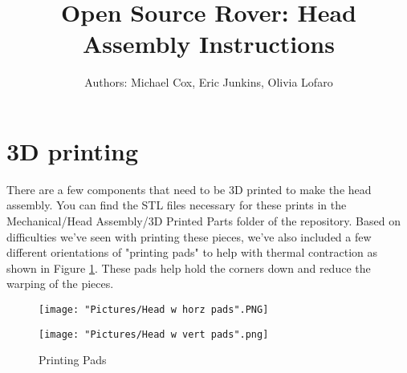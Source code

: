 \documentclass[12pt]{article}
\begin{document}
\newcommand\partimg{\includegraphics[width=2cm,height=1.25cm,keepaspectratio]}


\title{Open Source Rover: Head Assembly Instructions}
\author{Authors: Michael Cox, Eric Junkins, Olivia Lofaro}

\makeatletter
\def\@maketitle{
\begin{center}
	\makebox[\textwidth][c]{ \texttt{[image: "Pictures/Head final".png]}}
	{\Huge \bfseries \sffamily \@title }\\[3ex]
	{\Large \sffamily \@author}\\[3ex]
	\texttt{[image: "Pictures/JPL logo".png]}
\end{center}}
\makeatother

\maketitle



\newpage


\tableofcontents

\newpage

\section{3D printing}
There are a few components that need to be 3D printed to make the head assembly. You can find the STL files necessary for these prints in the Mechanical/Head Assembly/3D Printed Parts folder of the repository.  Based on difficulties we've seen with printing these pieces, we've also included a few different orientations of "printing pads" to help with thermal contraction as shown in Figure \ref{pads}. These pads help hold the corners down and reduce the warping of the pieces.

\begin{figure}[H]
  \centering
  \begin{minipage}[b]{0.45\textwidth}
    \texttt{[image: "Pictures/Head w horz pads".PNG]}
  \end{minipage}
  \hfill
  \begin{minipage}[b]{0.45\textwidth}
    \texttt{[image: "Pictures/Head w vert pads".png]}
  \end{minipage}
  \caption{Printing Pads}
  \label{pads}
\end{figure}
\end{document}
